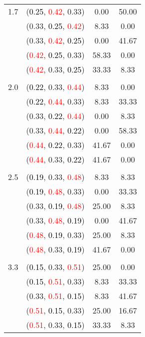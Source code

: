 \documentclass[10pt,a4paper]{report}
\begin{document}
\begin{center}
\begin{longtable}{clcc}
		1.7			&(\textcolor{black}{0.25}, \textcolor{red}{0.42}, 0.33)&0.00&50.00\\
			&(0.33, \textcolor{black}{0.25}, \textcolor{red}{0.42})&8.33&0.00\\
			&(0.33, \textcolor{red}{0.42}, \textcolor{black}{0.25})&0.00&41.67\\
			&(\textcolor{red}{0.42}, \textcolor{black}{0.25}, 0.33)&58.33&0.00\\
			&(\textcolor{red}{0.42}, 0.33, \textcolor{black}{0.25})&33.33&8.33\\
		&&&\\
		2.0			&(\textcolor{black}{0.22}, 0.33, \textcolor{red}{0.44})&8.33&0.00\\
			&(\textcolor{black}{0.22}, \textcolor{red}{0.44}, 0.33)&8.33&33.33\\
			&(0.33, \textcolor{black}{0.22}, \textcolor{red}{0.44})&0.00&8.33\\
			&(0.33, \textcolor{red}{0.44}, \textcolor{black}{0.22})&0.00&58.33\\
			&(\textcolor{red}{0.44}, \textcolor{black}{0.22}, 0.33)&41.67&0.00\\
			&(\textcolor{red}{0.44}, 0.33, \textcolor{black}{0.22})&41.67&0.00\\
		&&&\\
		2.5			&(\textcolor{black}{0.19}, 0.33, \textcolor{red}{0.48})&8.33&8.33\\
			&(\textcolor{black}{0.19}, \textcolor{red}{0.48}, 0.33)&0.00&33.33\\
			&(0.33, \textcolor{black}{0.19}, \textcolor{red}{0.48})&25.00&8.33\\
			&(0.33, \textcolor{red}{0.48}, \textcolor{black}{0.19})&0.00&41.67\\
			&(\textcolor{red}{0.48}, \textcolor{black}{0.19}, 0.33)&25.00&8.33\\
			&(\textcolor{red}{0.48}, 0.33, \textcolor{black}{0.19})&41.67&0.00\\
		&&&\\
		3.3			&(\textcolor{black}{0.15}, 0.33, \textcolor{red}{0.51})&25.00&0.00\\
			&(\textcolor{black}{0.15}, \textcolor{red}{0.51}, 0.33)&8.33&33.33\\
			&(0.33, \textcolor{red}{0.51}, \textcolor{black}{0.15})&8.33&41.67\\
			&(\textcolor{red}{0.51}, \textcolor{black}{0.15}, 0.33)&25.00&16.67\\
			&(\textcolor{red}{0.51}, 0.33, \textcolor{black}{0.15})&33.33&8.33\\
		\bottomrule
	\end{longtable}
\end{center}
\end{document}

